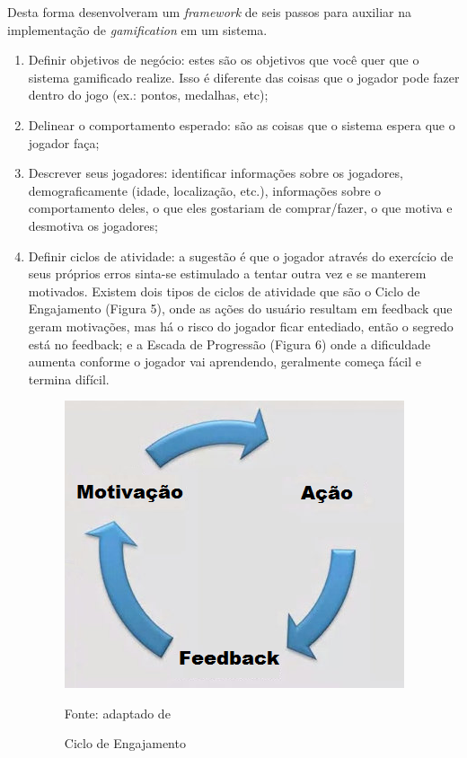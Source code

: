 \documentclass[
	12pt,				%
	openany,			%
	oneside,			%
	a4paper,			%
	english,			%
	french,				%
	spanish,			%
	brazil				%
	]{abntex2}
\begin{document}
Desta forma  desenvolveram um \textit{framework} de seis passos para auxiliar na implementação de \textit{gamification} em um sistema.
\begin{enumerate}
\item Definir objetivos de negócio: estes são os objetivos que você quer que o sistema gamificado realize. Isso é diferente das coisas que o jogador pode fazer dentro do jogo (ex.: pontos, medalhas, etc);
\item Delinear o comportamento esperado: são as coisas que o sistema espera que o jogador faça;
\item Descrever seus jogadores: identificar informações sobre os jogadores, demograficamente (idade, localização, etc.), informações sobre o comportamento deles, o que eles gostariam de comprar/fazer, o que motiva e desmotiva os jogadores;
\item Definir ciclos de atividade: a sugestão é que o jogador através do exercício de seus próprios erros sinta-se estimulado a tentar outra vez e se manterem motivados. Existem dois tipos de ciclos de atividade que são o Ciclo de Engajamento (Figura 5), onde as ações do usuário resultam em feedback que geram motivações, mas há o risco do jogador ficar entediado, então o segredo está no feedback; e a Escada de Progressão (Figura 6) onde a dificuldade aumenta conforme o jogador vai aprendendo, geralmente começa fácil e termina difícil. 
\begin{figure}[H]
    \centering
\caption{Ciclo de Engajamento}
\includegraphics[width=10cm]{figuras/loop.png}
\par
 Fonte: adaptado de 
\end{figure}


\end{enumerate}
\end{document}
